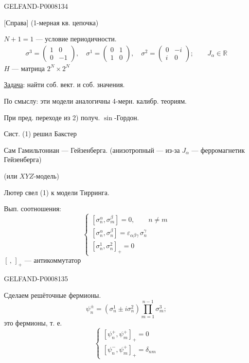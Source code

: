 \begin{GelfandAdjacentEvidence}{GELFAND-P000813}{4}


[Справа] (1-мерная кв. цепочка)

\(\boxed{N+1=1}\) — условие периодичности.
\[
\begin{gathered}
\sigma^3=\begin{pmatrix}1&0\\0&-1\end{pmatrix},\quad
\sigma^1=\begin{pmatrix}0&1\\1&0\end{pmatrix},\quad
\sigma^2=\begin{pmatrix}0&-i\\i&0\end{pmatrix};\qquad J_\alpha\in\mathbb R
\end{gathered}
\]
\(H\) — матрица \(2^N\times2^N\)

\uline{Задача}: найти соб. вект. и соб. значения.

По смыслу: эти модели аналогичны 4-мерн. калибр. теориям.

При пред. переходе из 2) получ. \(\sin\)-Гордон.

Сист. (1) решил Бакстер

Сам Гамильтониан — Гейзенберга. (анизотропный — из-за \(J_\alpha\) — ферромагнетик Гейзенберга)

(или \(XYZ\)-модель)

Лютер свел (1) к модели Тирринга.

Вып. соотношения:
\begin{equation*}
\begin{cases}
[\sigma_n^\alpha,\sigma_m^\beta]=0,\qquad n\ne m\\
[\sigma_n^\alpha,\sigma_n^\beta]=\varepsilon_{\alpha\beta\gamma}\,\sigma_n^\gamma\\
[\sigma_n^1,\sigma_n^2]_+=0
\end{cases}\tag{2}
\end{equation*}
\([\, ,\,]_+\) — антикоммутатор

\end{GelfandAdjacentEvidence}
\begin{GelfandAdjacentEvidence}{GELFAND-P000813}{5}


Сделаем решёточные фермионы.
\begin{equation*}
\psi_n^\pm=(\sigma_n^1\pm i\sigma_n^2)\prod_{m=1}^{n-1}\sigma_m^3;\tag{3}
\end{equation*}
это фермионы, т. е.
\begin{equation*}
\begin{cases}
[\psi_n^+,\psi_m^+]_+=0\\
[\psi_n^-,\psi_m^+]_+=\delta_{nm}
\end{cases}\tag{4}
\end{equation*}
\end{GelfandAdjacentEvidence}
